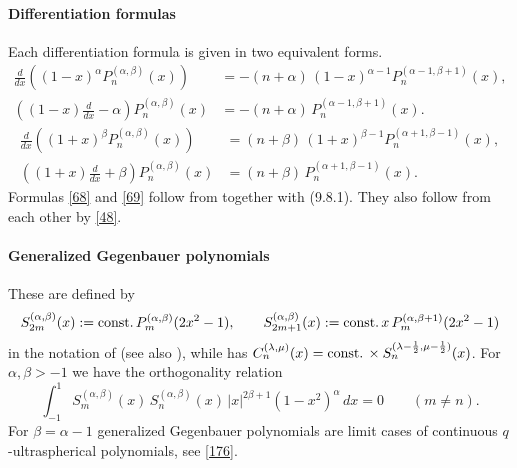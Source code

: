 \documentclass[twoside,11pt]{article}
\newcommand\al\alpha
\newcommand\be\beta
\newcommand\la\lambda
\newcommand\half{\frac12}
\newcommand\const{{\rm const.}\,}
\begin{document}
\paragraph{Differentiation formulas}
Each differentiation formula is given in two equivalent forms.
\begin{equation}
\begin{split}
\frac d{dx}\left((1-x)^\al P_n^{(\al,\be)}(x)\right)&=
-(n+\al)\,(1-x)^{\al-1} P_n^{(\al-1,\be+1)}(x),\\
\left((1-x)\frac d{dx}-\al\right)P_n^{(\al,\be)}(x)&=
-(n+\al)\,P_n^{(\al-1,\be+1)}(x).
\end{split}
\label{68}
\end{equation}
%
\begin{equation}
\begin{split}
\frac d{dx}\left((1+x)^\be P_n^{(\al,\be)}(x)\right)&=
(n+\be)\,(1+x)^{\be-1} P_n^{(\al+1,\be-1)}(x),\\
\left((1+x)\frac d{dx}+\be\right)P_n^{(\al,\be)}(x)&=
(n+\be)\,P_n^{(\al+1,\be-1)}(x).
\end{split}
\label{69}
\end{equation}
Formulas \eqref{68} and \eqref{69} follow from
together with (9.8.1). They also follow from each other by \eqref{48}.
%
\paragraph{Generalized Gegenbauer polynomials}
These are defined by
\begin{equation}
S_{2m}^{(\al,\be)}(x):=\const P_m^{(\al,\be)}(2x^2-1),\qquad
S_{2m+1}^{(\al,\be)}(x):=\const x\,P_m^{(\al,\be+1)}(2x^2-1)
\label{70}
\end{equation}
in the notation of 
(see also \cite{K27}), while \cite[Section 1.5.2]{K26}
has $C_n^{(\la,\mu)}(x)=\const\allowbreak\times S_n^{(\la-\half,\mu-\half)}(x)$.
For $\al,\be>-1$ we have the orthogonality relation
\begin{equation}
\int_{-1}^1 S_m^{(\al,\be)}(x)\,S_n^{(\al,\be)}(x)\,|x|^{2\be+1}(1-x^2)^\al\,dx
=0\qquad(m\ne n).
\label{71}
\end{equation}
For $\be=\al-1$ generalized Gegenbauer polynomials are limit cases of
continuous $q$-ultraspherical polynomials, see \eqref{176}.
\end{document}

